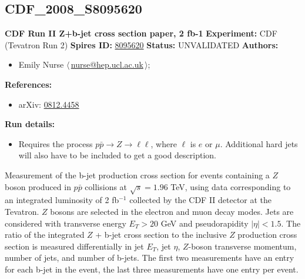 \subsection[CDF\_2008\_S8095620]{CDF\_2008\_S8095620\,\cite{Aaltonen:2008mt}}
\textbf{CDF Run II Z+b-jet cross section paper, 2 fb-1}\newline
\textbf{Experiment:} CDF (Tevatron Run 2) \newline
\textbf{Spires ID:} \href{http://www.slac.stanford.edu/spires/find/hep/www?rawcmd=key+8095620}{8095620}\newline
\textbf{Status:} UNVALIDATED\newline
\textbf{Authors:}
\begin{itemize}
  \item Emily Nurse $\langle\,$\href{mailto:nurse@hep.ucl.ac.uk}{nurse@hep.ucl.ac.uk}$\,\rangle$;
\end{itemize}
\textbf{References:}
\begin{itemize}
  \item arXiv: \href{http://arxiv.org/abs/0812.4458}{0812.4458}
\end{itemize}
\textbf{Run details:}
\begin{itemize}

  \item Requires the process $p\bar{p} \rightarrow {Z} \rightarrow{\ell}\ell$, where $\ell$ is $e$ or $\mu$. Additional hard jets will also have to be included to get a good description.\end{itemize}

\noindent Measurement of the b-jet production cross section for events containing a $Z$ boson produced in $p\bar{p}$ collisions at $\sqrt{s}=1.96$ TeV, using data corresponding to an integrated luminosity of 2 fb$^{-1}$ collected by the CDF II detector at the Tevatron. $Z$ bosons are selected in the electron and muon decay modes. Jets are considered with transverse energy $E_T>20$ GeV and pseudorapidity $|\eta|<1.5$. The ratio of the integrated $Z$ + b-jet cross section to the inclusive $Z$ production cross section is measured differentially in jet $E_T$, jet $\eta$, $Z$-boson transverse momentum, number of jets, and number of b-jets. The first two measurements have an entry for each b-jet in the event, the last three measurements have one entry per event.

\clearpage


\clearpage

